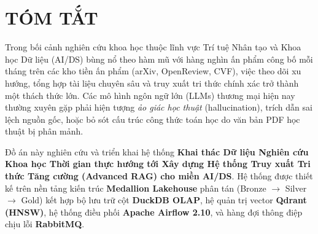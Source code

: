 
\chapter*{TÓM TẮT}

Trong bối cảnh nghiên cứu khoa học thuộc lĩnh vực Trí tuệ Nhân tạo và Khoa học Dữ liệu (AI/DS) bùng nổ theo hàm mũ với hàng nghìn ấn phẩm công bố mỗi tháng trên các kho tiền ấn phẩm (arXiv, OpenReview, CVF), việc theo dõi xu hướng, tổng hợp tài liệu chuyên sâu và truy xuất tri thức chính xác trở thành một thách thức lớn. Các mô hình ngôn ngữ lớn (LLMs) thương mại hiện nay thường xuyên gặp phải hiện tượng \textit{ảo giác học thuật} (hallucination), trích dẫn sai lệch nguồn gốc, hoặc bỏ sót cấu trúc công thức toán học do văn bản PDF học thuật bị phân mảnh. 

Đồ án này nghiên cứu và triển khai hệ thống \textbf{Khai thác Dữ liệu Nghiên cứu Khoa học Thời gian thực hướng tới Xây dựng Hệ thống Truy xuất Tri thức Tăng cường (Advanced RAG) cho miền AI/DS}. Hệ thống được thiết kế trên nền tảng kiến trúc \textbf{Medallion Lakehouse} phân tán (Bronze $\to$ Silver $\to$ Gold) kết hợp bộ lưu trữ cột \textbf{DuckDB OLAP}, hệ quản trị vector \textbf{Qdrant (HNSW)}, hệ thống điều phối \textbf{Apache Airflow 2.10}, và hàng đợi thông điệp chịu lỗi \textbf{RabbitMQ}.

